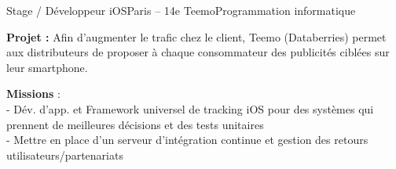 \begin{minipage}{\textwidth}
		\smallskip{}
		{Stage / Développeur iOS}{Paris – 14e}
		{Teemo}{Programmation informatique}
		{\textbf{Projet :} Afin d’augmenter le trafic chez le client, Teemo (Databerries) permet aux distributeurs de proposer à chaque consommateur des publicités ciblées sur leur smartphone.
			
			\textbf{Missions} :
			\\- Dév. d'app. et Framework universel de tracking iOS pour des systèmes qui prennent de meilleures décisions et des tests unitaires
			\\- Mettre en place d'un serveur d'intégration continue et gestion des retours utilisateurs/partenariats
		}
	\end{minipage}